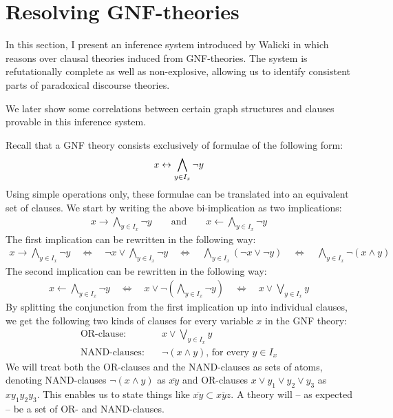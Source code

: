 

\section{Resolving GNF-theories}
\label{sec:Resolving GNF-theories}
In this section, I present an inference system introduced by Walicki in \cite{michal-completeness} which reasons over clausal theories induced from GNF-theories.
The system is refutationally complete as well as non-explosive, allowing us to identify consistent parts of paradoxical discourse theories.

We later show some correlations between certain graph structures and clauses provable in this inference system.

Recall that a GNF theory consists exclusively of formulae of the following form:
\begin{align}
  x \leftrightarrow \bigwedge_{y \in I_x} \neg y
\end{align}
Using simple operations only, these formulae can be translated into an equivalent set of clauses.
We start by writing the above bi-implication as two implications:
\begin{align}
  x \rightarrow \bigwedge_{y \in I_x} \neg y \quad\quad \text{and} \quad\quad x \leftarrow \bigwedge_{y \in I_x} \neg y
\end{align}
The first implication can be rewritten in the following way:
\begin{align}
  x \rightarrow \bigwedge_{y \in I_x} \neg y
  \quad\Leftrightarrow\quad \neg x \vee \bigwedge_{y \in I_x} \neg y
  \quad\Leftrightarrow\quad \bigwedge_{y \in I_x} (\neg x \vee \neg y)
  \quad\Leftrightarrow\quad \bigwedge_{y \in I_x} \neg (x \wedge y)
\end{align}
The second implication can be rewritten in the following way:
\begin{align}
  x \leftarrow \bigwedge_{y \in I_x} \neg y
  \quad\Leftrightarrow\quad x \vee \neg \left( \bigwedge_{y \in I_x} \neg y \right)
  \quad\Leftrightarrow\quad x \vee \bigvee_{y \in I_x} y
\end{align}
By splitting the conjunction from the first implication up into individual clauses, we get the following two kinds of clauses for every variable $x$ in the GNF theory:
\begin{align}
  \text{OR-clause:}&\quad x \vee \bigvee_{y \in I_x} y\\
  \text{NAND-clauses:}&\quad \neg (x \wedge y)\text{, for every }y \in I_x
\end{align}
We will treat both the OR-clauses and the NAND-clauses as sets of atoms, denoting NAND-clauses $\neg (x \wedge y)$ as $\overline{xy}$ and OR-clauses $x \vee y_1 \vee y_2 \vee y_3$ as $xy_1y_2y_3$.
This enables us to state things like $\overline{xy} \subset \overline{xyz}$.
A theory will -- as expected -- be a set of OR- and NAND-clauses.

